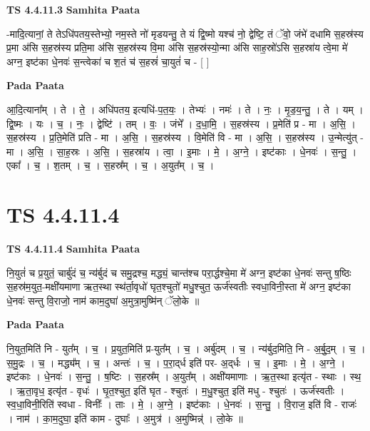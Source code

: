 \documentclass[17pt]{extarticle}
\begin{document}
\textbf{TS 4.4.11.3 } \newline
\textbf{Samhita Paata} \newline

-मादि॒त्यानां॒ ते तेऽधि॑पतय॒स्तेभ्यो॒ नम॒स्ते नो॑ मृडयन्तु॒ ते यं द्वि॒ष्मो यश्च॑ नो॒ द्वेष्टि॒ तं ॅवो॒ जंभे॑ दधामि स॒हस्र॑स्य प्र॒मा अ॑सि स॒हस्र॑स्य प्रति॒मा अ॑सि स॒हस्र॑स्य वि॒मा अ॑सि स॒हस्र॑स्यो॒न्मा अ॑सि साह॒स्रो॑ऽसि स॒हस्रा॑य त्वे॒मा मे॑ अग्न॒ इष्ट॑का धे॒नवः॑ स॒न्त्वेका॑ च श॒तं च॑ स॒हस्रं॑ चा॒युतं॑ च - [  ] \newline

\textbf{Pada Paata} \newline

आ॒दि॒त्याना᳚म् । ते । ते॒ । अधि॑पतय॒ इत्यधि॑-प॒त॒यः॒ । तेभ्यः॑ । नमः॑ । ते । नः॒ । मृ॒ड॒य॒न्तु॒ । ते । यम् । द्वि॒ष्मः । यः । च॒ । नः॒ । द्वेष्टि॑ । तम् । वः॒ । जंभे᳚ । द॒धा॒मि॒ । स॒हस्र॑स्य । प्र॒मेति॑ प्र - मा । अ॒सि॒ । स॒हस्र॑स्य । प्र॒ति॒मेति॑ प्रति - मा । अ॒सि॒ । स॒हस्र॑स्य । वि॒मेति॑ वि - मा । अ॒सि॒ । स॒हस्र॑स्य । उ॒न्मेत्यु॑त् - मा । अ॒सि॒ । सा॒ह॒स्रः । अ॒सि॒ । स॒हस्रा॑य । त्वा॒ । इ॒माः । मे॒ । अ॒ग्ने॒ । इष्ट॑काः । धे॒नवः॑ । स॒न्तु॒ । एका᳚ । च॒ । श॒तम् । च॒ । स॒हस्र᳚म् । च॒ । अ॒युत᳚म् । च॒ ।  \newline




\section*{ TS 4.4.11.4 }

\textbf{TS 4.4.11.4 } \newline
\textbf{Samhita Paata} \newline

नि॒युतं॑ च प्र॒युतं॒ चार्बु॑दं च॒ न्य॑र्बुदं च समु॒द्रश्च॒ मद्ध्यं॒ चान्त॑श्च परा॒र्द्धश्चे॒मा मे॑ अग्न॒ इष्ट॑का धे॒नवः॑ सन्तु ष॒ष्ठिः स॒हस्र॑म॒युत॒-मक्षी॑यमाणा ऋत॒स्था स्थ॑र्ता॒वृधो॑ घृत॒श्चुतो॑ मधु॒श्चुत॒ ऊर्ज॑स्वतीः स्वधा॒विनी॒स्ता मे॑ अग्न॒ इष्ट॑का धे॒नवः॑ सन्तु वि॒राजो॒ नाम॑ काम॒दुघा॑ अ॒मुत्रा॒मुष्मि॑न् ॅलो॒के ॥ \newline

\textbf{Pada Paata} \newline

नि॒युत॒मिति॑ नि - युत᳚म् । च॒ । प्र॒युत॒मिति॑ प्र-युत᳚म् । च॒ । अर्बु॑दम् । च॒ । न्य॑र्बुद॒मिति॒ नि - अ॒र्बु॒द॒म् । च॒ । स॒मु॒द्रः । च॒ । मद्ध्य᳚म् । च॒ । अन्तः॑ । च॒ । प॒रा॒द्‌र्ध इति॑ पर- अ॒द्‌र्धः । च॒ । इ॒माः । मे॒ । अ॒ग्ने॒ । इष्ट॑काः । धे॒नवः॑ । स॒न्तु॒ । ष॒ष्टिः । स॒हस्र᳚म् । अ॒युत᳚म् । अक्षी॑यमाणाः । ऋ॒त॒स्था इत्यृ॑त - स्थाः । स्थ॒ । ऋ॒ता॒वृध॒ इत्यृ॑त - वृधः॑ । घृ॒त॒श्चुत॒ इति॑ घृत - श्चुतः॑ । म॒धु॒श्चुत॒ इति॑ मधु - श्चुतः॑ । ऊर्ज॑स्वतीः । स्व॒धा॒विनी॒रिति॑ स्वधा - विनीः᳚ । ताः । मे॒ । अ॒ग्ने॒ । इष्ट॑काः । धे॒नवः॑ । स॒न्तु॒ । वि॒राज॒ इति॑ वि - राजः॑ । नाम॑ । का॒म॒दुघा॒ इति॑ काम - दुघाः᳚ । अ॒मुत्र॑ । अ॒मुष्मिन्न्॑ । लो॒के ॥  \newline
\end{document}
